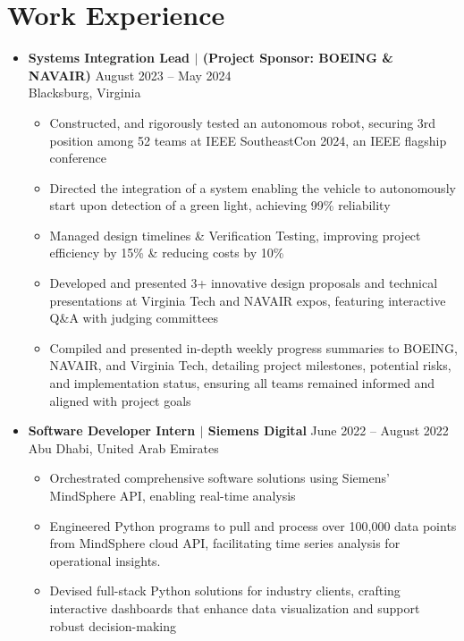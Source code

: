 \documentclass[letterpaper,11pt]{article}
\begin{document}
\section{Work Experience}
\begin{itemize}[leftmargin=0mm, label={}, itemsep=0pt]
  \item \vspace{-2pt} \textbf{Systems Integration Lead $|$ (Project Sponsor: BOEING \& NAVAIR)} \hfill {August 2023 -- May 2024} \\
  \small Blacksburg, Virginia
  \vspace{-0.30\baselineskip} %
  \begin{itemize}[leftmargin=5mm, itemsep=0pt, topsep=0pt]
    \item \small Constructed, and rigorously tested an autonomous robot, securing 3rd position among 52 teams at IEEE SoutheastCon 2024, an IEEE flagship conference
    \item \small Directed the integration of a system enabling the vehicle to autonomously start upon detection of a green light, achieving 99\% reliability
    \item \small Managed design timelines \& Verification Testing, improving project efficiency by 15\% \& reducing costs by 10\%
    \item \small 
Developed and presented 3+ innovative design proposals and technical presentations at Virginia Tech and NAVAIR expos, featuring interactive Q\&A with judging committees
    \item \small Compiled and presented in-depth weekly progress summaries to BOEING, NAVAIR, and Virginia Tech, detailing project milestones, potential risks, and implementation status, ensuring all teams remained informed and aligned with project goals
  \end{itemize}
  
  \item \vspace{-2pt} \textbf{Software Developer Intern $|$ Siemens Digital} \hfill {June 2022 -- August 2022} \\
  \small Abu Dhabi, United Arab Emirates
   \vspace{-0.30\baselineskip} %
  \begin{itemize}[leftmargin=5mm, itemsep=0pt, topsep=0pt]
    \item \small Orchestrated comprehensive software solutions using Siemens' MindSphere API, enabling real-time analysis
    \item \small Engineered Python programs to pull and process over 100,000 data points from MindSphere cloud API, facilitating time series analysis for operational insights.
    \item \small Devised full-stack Python solutions for industry clients, crafting interactive dashboards that enhance data visualization and support robust decision-making
  \end{itemize}
  

\end{itemize}
\end{document}
